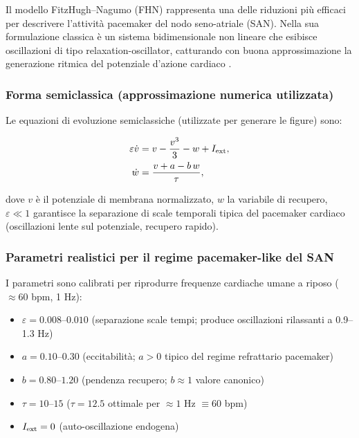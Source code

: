 \documentclass[11pt,a4paper]{article}
\let\oldcite\cite
\renewcommand{\cite}{\protect\oldcite}
\theoremstyle{plain}
\theoremstyle{definition}
\begin{document}
Il modello FitzHugh–Nagumo (FHN) rappresenta una delle riduzioni più efficaci per descrivere l’attività pacemaker del nodo seno-atriale (SAN). Nella sua formulazione classica è un sistema bidimensionale non lineare che esibisce oscillazioni di tipo relaxation-oscillator, catturando con buona approssimazione la generazione ritmica del potenziale d’azione cardiaco \cite{FitzHugh1961, Nagumo1962}.

\vspace{0.2cm}

\subsubsection{Forma semiclassica (approssimazione numerica utilizzata)}

Le equazioni di evoluzione semiclassiche (utilizzate per generare le figure) sono:

\begin{align}
    \varepsilon \dot{v} &= v - \frac{v^3}{3} - w + I_{\rm ext}, \\
    \dot{w} &= \frac{v + a - b\, w}{\tau},
    \label{eq:fhn-semiclassical}
\end{align}

dove $v$ è il potenziale di membrana normalizzato, $w$ la variabile di recupero, $\varepsilon \ll 1$ garantisce la separazione di scale temporali tipica del pacemaker cardiaco (oscillazioni lente sul potenziale, recupero rapido).


\vspace{0.4cm}

\subsubsection{Parametri realistici per il regime pacemaker-like del SAN}

I parametri sono calibrati per riprodurre frequenze cardiache umane a riposo ($\approx 60$ bpm, 1 Hz):

\begin{itemize}
    \item $\varepsilon = 0.008$--$0.010$ \quad (separazione scale tempi; produce oscillazioni rilassanti a 0.9--1.3 Hz)
    \item $a = 0.10$--$0.30$ \quad (eccitabilità; $a > 0$ tipico del regime refrattario pacemaker)
    \item $b = 0.80$--$1.20$ \quad (pendenza recupero; $b \approx 1$ valore canonico)
    \item $\tau = 10$--$15$ \quad ($\tau = 12.5$ ottimale per $\approx 1$ Hz $\equiv 60$ bpm)
    \item $I_{\rm ext} = 0$ \quad (auto-oscillazione endogena)
\end{itemize}
\end{document}
